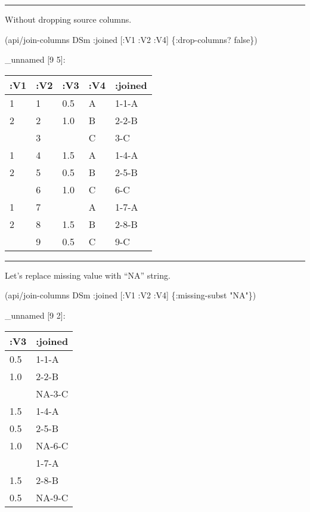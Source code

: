\documentclass[]{article}
\newenvironment{Shaded}{\begin{snugshade}}{\end{snugshade}}
\newcommand{\AttributeTok}[1]{\textcolor[rgb]{0.77,0.63,0.00}{#1}}
\newcommand{\NormalTok}[1]{#1}
\newcommand{\StringTok}[1]{\textcolor[rgb]{0.31,0.60,0.02}{#1}}
\newcommand{\VariableTok}[1]{\textcolor[rgb]{0.00,0.00,0.00}{#1}}
\begin{document}
\begin{center}\rule{0.5\linewidth}{0.5pt}\end{center}

Without dropping source columns.

\begin{Shaded}
\begin{Highlighting}[]
\NormalTok{(api/join-columns DSm }\AttributeTok{:joined}\NormalTok{ [}\AttributeTok{:V1} \AttributeTok{:V2} \AttributeTok{:V4}\NormalTok{] \{}\AttributeTok{:drop-columns}\NormalTok{? }\VariableTok{false}\NormalTok{\})}
\end{Highlighting}
\end{Shaded}

\_unnamed {[}9 5{]}:

\begin{longtable}[]{@{}lllll@{}}
\toprule
:V1 & :V2 & :V3 & :V4 & :joined\tabularnewline
\midrule
\endhead
1 & 1 & 0.5 & A & 1-1-A\tabularnewline
2 & 2 & 1.0 & B & 2-2-B\tabularnewline
& 3 & & C & 3-C\tabularnewline
1 & 4 & 1.5 & A & 1-4-A\tabularnewline
2 & 5 & 0.5 & B & 2-5-B\tabularnewline
& 6 & 1.0 & C & 6-C\tabularnewline
1 & 7 & & A & 1-7-A\tabularnewline
2 & 8 & 1.5 & B & 2-8-B\tabularnewline
& 9 & 0.5 & C & 9-C\tabularnewline
\bottomrule
\end{longtable}

\begin{center}\rule{0.5\linewidth}{0.5pt}\end{center}

Let's replace missing value with ``NA'' string.

\begin{Shaded}
\begin{Highlighting}[]
\NormalTok{(api/join-columns DSm }\AttributeTok{:joined}\NormalTok{ [}\AttributeTok{:V1} \AttributeTok{:V2} \AttributeTok{:V4}\NormalTok{] \{}\AttributeTok{:missing-subst} \StringTok{"NA"}\NormalTok{\})}
\end{Highlighting}
\end{Shaded}

\_unnamed {[}9 2{]}:

\begin{longtable}[]{@{}ll@{}}
\toprule
:V3 & :joined\tabularnewline
\midrule
\endhead
0.5 & 1-1-A\tabularnewline
1.0 & 2-2-B\tabularnewline
& NA-3-C\tabularnewline
1.5 & 1-4-A\tabularnewline
0.5 & 2-5-B\tabularnewline
1.0 & NA-6-C\tabularnewline
& 1-7-A\tabularnewline
1.5 & 2-8-B\tabularnewline
0.5 & NA-9-C\tabularnewline
\bottomrule
\end{longtable}
\end{document}
